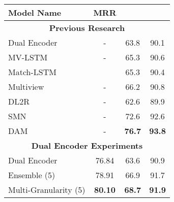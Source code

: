 \documentclass[11pt,a4paper]{article}
\begin{document}
\begin{table*}[]
\centering
\begin{tabular}{|l|c|c|c|}
\hline
\textbf{Model Name}            & \multicolumn{1}{l|}{\textbf{MRR}} & \multicolumn{1}{l|}{\textbf{}} & \multicolumn{1}{l|}{\textbf{}} \\ \hline

\multicolumn{4}{|c|}{\textbf{Previous Research}} \\ \hline

Dual Encoder \citep{lowe2015ubuntu}                  & -                                 & 63.8                               & 90.1                                \\                   
MV-LSTM \citep{pang2016text}                          & -                                 & 65.3                               & 90.6                                \\ 
Match-LSTM \citep{wang2016machine}                     &                                   & 65.3                               & 90.4                                \\ 
Multiview \citep{zhou2016multi}                      & -                                 & 66.2                               & 90.8                                \\ 
DL2R \citep{yan2016learning}                           & -                                 & 62.6                               & 89.9                                \\ 
SMN \citep{wu2016sequential}                           & -                                 & 72.6                               & 92.6                                \\ 
DAM \citep{zhou2018multi}                            & -                                 & \textbf{76.7}                              & \textbf{93.8}                                \\ \hline
\multicolumn{4}{|c|}{\textbf{Dual Encoder Experiments}} \\ \hline
Dual Encoder \citep{lowe2015ubuntu}                   & 76.84                             & 63.6                              & 90.9                               \\ 
Ensemble  (5)                 & 78.91                             & 66.9                              & 91.7                               \\ 
Multi-Granularity (5)        & \textbf{80.10}                            & \textbf{68.7}                              & \textbf{91.9}                              \\ \hline

\end{tabular}
\end{table*}
\end{document}
